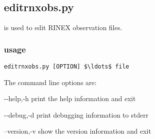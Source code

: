 \subsection{editrnxobs.py}

\hypertarget{h:editrnxobs}{}

 is used to edit RINEX observation files. 

\subsubsection{usage}

\begin{lstlisting}[mathescape=true]
editrnxobs.py [OPTION] $\ldots$ file 
\end{lstlisting}
The command line options are:
\begin{description*}
	\item[-{}-help,-h]	print the help information and exit
	\item[-{}-debug,-d]	print debugging information to stderr
	\item[--version,-v] show the version information and exit
\end{description*}

